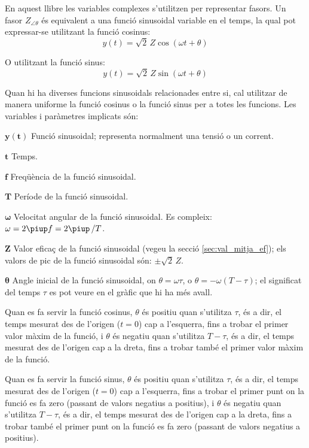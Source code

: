 \pagebreak

En aquest llibre les variables complexes s'utilitzen per representar fasors. Un fasor $Z_{\angle \theta}$ és equivalent a una funció sinusoidal variable en el temps, la qual pot expressar-se utilitzant la funció cosinus:
\[y(t)=\sqrt{2}\, Z \cos(\omega t + \theta)\]

O utilitzant la funció sinus:
\[y(t)=\sqrt{2}\, Z \sin(\omega t + \theta)\]

Quan hi ha diverses funcions sinusoidals relacionades entre si, cal utilitzar de manera uniforme la funció cosinus o la funció sinus per a totes les funcions. Les variables i paràmetres implicats són:
\begin{list}{}
{\setlength{\labelwidth}{15mm} \setlength{\leftmargin}{20mm}
\setlength{\labelsep}{5mm}}
    \item[$\boldsymbol{y(t)}$] Funció sinusoidal; representa normalment una tensió o un corrent.
    \item[$\boldsymbol{t}$] Temps.
    \item[$\boldsymbol{f}$] Freqüència de la funció sinusoidal.
    \item[$\boldsymbol{T}$] Període de la funció sinusoidal.
    \item[$\boldsymbol{\omega}$] Velocitat angular de la funció sinusoidal. Es compleix: $\omega = 2 \piup f = 2 \piup\,/T$.
    \item[$\boldsymbol{Z}$] Valor eficaç de la funció sinusoidal (vegeu la secció \vref{sec:val_mitja_ef}); els valors de pic de la funció sinusoidal  són:  $\pm\sqrt{2}\, Z$.
    \item[$\boldsymbol{\theta}$] Angle inicial de la funció sinusoidal, on  $\theta=\omega \tau$, o $\theta=-\omega (T-\tau)$; el significat del temps $\tau$  es pot veure en el gràfic que hi ha més avall.

    Quan es fa servir la funció cosinus, $\theta$ és positiu quan s'utilitza $\tau$, és a dir, el temps mesurat  des de l'origen ($t=0$) cap a l'esquerra, fins a trobar el primer valor màxim de la funció, i $\theta$ és negatiu quan s'utilitza $T-\tau$, és a dir, el temps mesurat des de l'origen cap a la dreta, fins a trobar també el primer valor màxim de la funció.

    Quan es fa servir la funció sinus, $\theta$ és positiu quan s'utilitza $\tau$, és a dir, el temps mesurat des de l'origen ($t=0$) cap a l'esquerra, fins a trobar el primer punt on la funció es fa zero (passant de valors negatius a positius), i $\theta$ és negatiu quan s'utilitza $T-\tau$, és a dir, el temps mesurat des de l'origen cap a la dreta, fins a trobar també el primer punt on la funció es fa zero (passant de valors negatius a positius).
    \item[] 
\end{list}


